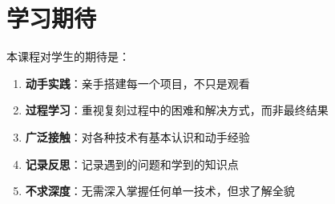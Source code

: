 \documentclass[12pt,a4paper]{article}
\begin{document}
\section{学习期待}

本课程对学生的期待是：

\begin{enumerate}
    \item \textbf{动手实践}：亲手搭建每一个项目，不只是观看
    \item \textbf{过程学习}：重视复刻过程中的困难和解决方式，而非最终结果
    \item \textbf{广泛接触}：对各种技术有基本认识和动手经验
    \item \textbf{记录反思}：记录遇到的问题和学到的知识点
    \item \textbf{不求深度}：无需深入掌握任何单一技术，但求了解全貌
\end{enumerate}
\end{document}
